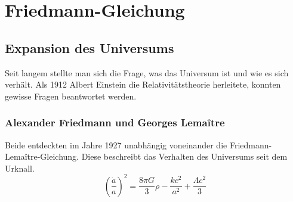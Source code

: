 \chapter{Friedmann-Gleichung\label{chapter:thema}}
\begin{refsection}
\printbibliography[heading=subbibliography]
\section{Expansion des Universums}
Seit langem stellte man sich die Frage, was das Universum ist und wie es sich verhält. Als 1912 Albert Einstein die Relativitätstheorie herleitete, konnten gewisse Fragen beantwortet werden.
\subsection{Alexander Friedmann und Georges Lema\^{i}tre}
Beide entdeckten im Jahre 1927 unabhängig voneinander die Friedmann-Lema\^{i}tre-Gleichung. Diese beschreibt das Verhalten des Universums seit dem Urknall. 
\begin{equation}
\left(\frac{\dot{a}}{a}\right) ^2 = \frac{8 \pi G}{3} \rho - \frac{k c^2}{a^2} + \frac{\Lambda c^2}{3}
\end{equation}

\end{refsection}
